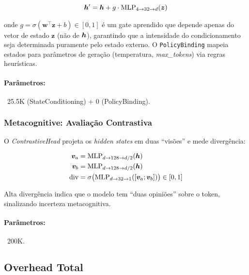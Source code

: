 \begin{equation}
    \bm{h}' = \bm{h} + g \cdot \text{MLP}_{4 \to 32 \to d}(\bm{z})
\end{equation}

onde $g = \sigma(\bm{w}^\top \bm{z} + b) \in [0, 1]$ \'e um gate
aprendido que depende apenas do vetor de estado $\bm{z}$ (n\~ao de
$\bm{h}$), garantindo que a intensidade do condicionamento seja
determinada puramente pelo estado externo. O \texttt{PolicyBinding}
mapeia estados para par\^ametros de gera\c{c}\~ao (temperatura,
\textit{max\_tokens}) via regras heur\'isticas.

\paragraph{Par\^ametros:} ~25.5K (StateConditioning) + 0 (PolicyBinding).

\subsubsection{Metacognitive: Avalia\c{c}\~ao Contrastiva}
\label{sec:metacognitive}

O \textit{ContrastiveHead} projeta os \textit{hidden states} em duas
``vis\~oes'' e mede diverg\^encia:

\begin{align}
    \bm{v}_a &= \text{MLP}_{d \to 128 \to d/2}(\bm{h}) \\
    \bm{v}_b &= \text{MLP}_{d \to 128 \to d/2}(\bm{h}) \\
    \text{div} &= \sigma\big(\text{MLP}_{d \to 32 \to 1}([\bm{v}_a; \bm{v}_b])\big) \in [0, 1]
\end{align}

Alta diverg\^encia indica que o modelo tem ``duas opini\~oes'' sobre o
token, sinalizando incerteza metacognitiva.

\paragraph{Par\^ametros:} ~200K.

\subsection{Overhead Total}

